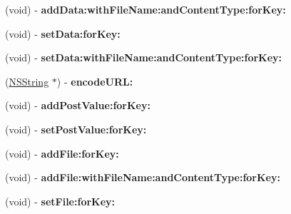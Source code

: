 \begin{DoxyCompactItemize}
\item 
\hypertarget{interface_a_s_i_form_data_request_a8ea88f81e036a80e7e7b7f9af04ac421}{
(void) -\/ {\bfseries add\-Data\-:with\-File\-Name\-:and\-Content\-Type\-:for\-Key\-:}}
\label{interface_a_s_i_form_data_request_a8ea88f81e036a80e7e7b7f9af04ac421}

\item 
\hypertarget{interface_a_s_i_form_data_request_a707a5cef615835146cdbed3ceca31016}{
(void) -\/ {\bfseries set\-Data\-:for\-Key\-:}}
\label{interface_a_s_i_form_data_request_a707a5cef615835146cdbed3ceca31016}

\item 
\hypertarget{interface_a_s_i_form_data_request_abbcca0f83bbe93f0132094a99a274098}{
(void) -\/ {\bfseries set\-Data\-:with\-File\-Name\-:and\-Content\-Type\-:for\-Key\-:}}
\label{interface_a_s_i_form_data_request_abbcca0f83bbe93f0132094a99a274098}

\item 
\hypertarget{interface_a_s_i_form_data_request_ab8c6677cbdb0cd4bf7660b79e5afa334}{
(\hyperlink{class_n_s_string}{\-N\-S\-String} $\ast$) -\/ {\bfseries encode\-U\-R\-L\-:}}
\label{interface_a_s_i_form_data_request_ab8c6677cbdb0cd4bf7660b79e5afa334}

\item 
\hypertarget{interface_a_s_i_form_data_request_af9571a143a9feeb009c33c458447aa98}{
(void) -\/ {\bfseries add\-Post\-Value\-:for\-Key\-:}}
\label{interface_a_s_i_form_data_request_af9571a143a9feeb009c33c458447aa98}

\item 
\hypertarget{interface_a_s_i_form_data_request_a90236e7099afbab72bb160029df5a368}{
(void) -\/ {\bfseries set\-Post\-Value\-:for\-Key\-:}}
\label{interface_a_s_i_form_data_request_a90236e7099afbab72bb160029df5a368}

\item 
\hypertarget{interface_a_s_i_form_data_request_afa340cd3b263a621a4f52015cdb8c568}{
(void) -\/ {\bfseries add\-File\-:for\-Key\-:}}
\label{interface_a_s_i_form_data_request_afa340cd3b263a621a4f52015cdb8c568}

\item 
\hypertarget{interface_a_s_i_form_data_request_ae413f676daaf869aa3cac76371466c16}{
(void) -\/ {\bfseries add\-File\-:with\-File\-Name\-:and\-Content\-Type\-:for\-Key\-:}}
\label{interface_a_s_i_form_data_request_ae413f676daaf869aa3cac76371466c16}

\item 
\hypertarget{interface_a_s_i_form_data_request_a8b097474a664290880231fd4439f352e}{
(void) -\/ {\bfseries set\-File\-:for\-Key\-:}}
\label{interface_a_s_i_form_data_request_a8b097474a664290880231fd4439f352e}


\end{DoxyCompactItemize}
